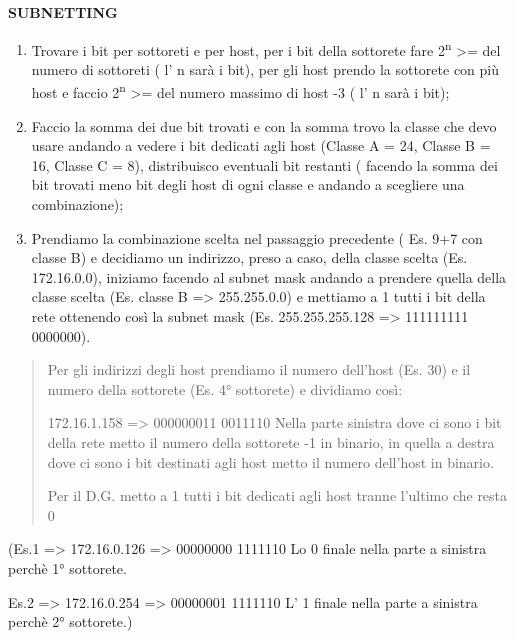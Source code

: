 \textbf{SUBNETTING}

\begin{enumerate}
\def\labelenumi{\arabic{enumi})}
\item
  Trovare i bit per sottoreti e per host, per i bit della sottorete fare
  2\textsuperscript{n} \textgreater= del numero di sottoreti ( l' n sarà
  i bit), per gli host prendo la sottorete con più host e faccio
  2\textsuperscript{n} \textgreater= del numero massimo di host -3 ( l'
  n sarà i bit);
\item
  Faccio la somma dei due bit trovati e con la somma trovo la classe che
  devo usare andando a vedere i bit dedicati agli host (Classe A = 24,
  Classe B = 16, Classe C = 8), distribuisco eventuali bit restanti (
  facendo la somma dei bit trovati meno bit degli host di ogni classe e
  andando a scegliere una combinazione);
\item
  Prendiamo la combinazione scelta nel passaggio precedente ( Es. 9+7
  con classe B) e decidiamo un indirizzo, preso a caso, della classe
  scelta (Es. 172.16.0.0), iniziamo facendo al subnet mask andando a
  prendere quella della classe scelta (Es. classe B =\textgreater{}
  255.255.0.0) e mettiamo a 1 tutti i bit della rete ottenendo così la
  subnet mask (Es. 255.255.255.128 =\textgreater{} 111111111 \textbar{}
  0000000).
\end{enumerate}

\begin{quote}
Per gli indirizzi degli host prendiamo il numero dell'host (Es. 30) e il
numero della sottorete (Es. 4° sottorete) e dividiamo così:

172.16.1.158 =\textgreater{} 000000011 \textbar{} 0011110 Nella parte
sinistra dove ci sono i bit della rete metto il numero della sottorete
-1 in binario, in quella a destra dove ci sono i bit destinati agli host
metto il numero dell'host in binario.

Per il D.G. metto a 1 tutti i bit dedicati agli host tranne l'ultimo che
resta 0
\end{quote}

(Es.1 =\textgreater{} 172.16.0.126 =\textgreater{} 00000000 \textbar{}
1111110 Lo 0 finale nella parte a sinistra perchè 1° sottorete.

Es.2 =\textgreater{} 172.16.0.254 =\textgreater{} 00000001 \textbar{}
1111110 L' 1 finale nella parte a sinistra perchè 2° sottorete.)

